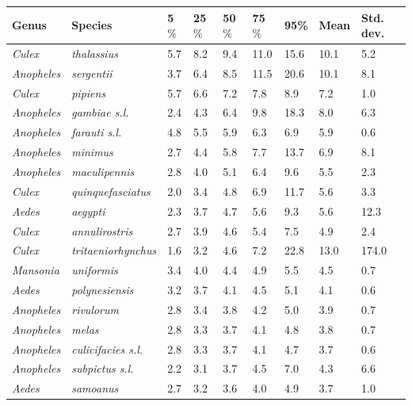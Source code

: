 \documentclass[12pt]{article}
\begin{document}
\begin{table}[htbp!]
	\begin{tabular}{l|l|l|l|l|l|l|l|l}
		\textbf{Genus} & \textbf{Species} & \textbf{5$\%$} & \textbf{25$\%$} & \textbf{50$\%$} & \textbf{75$\%$} & \textbf{95\%} &  \textbf{Mean} & \textbf{Std. dev.}\\
		\hline
		\textit{Culex} & \textit{thalassius} & 5.7 & 8.2 & 9.4 & 11.0 & 15.6 & 10.1 & 5.2 \\
		\textit{Anopheles} & \textit{sergentii} & 3.7 & 6.4 & 8.5 & 11.5 & 20.6 & 10.1 & 8.1 \\
		\textit{Culex} & \textit{pipiens} & 5.7 & 6.6 & 7.2 & 7.8 & 8.9 & 7.2 & 1.0 \\
		\textit{Anopheles} & \textit{gambiae s.l.} & 2.4 & 4.3 & 6.4 & 9.8 & 18.3 & 8.0 & 6.3 \\
		\textit{Anopheles} & \textit{farauti s.l.} & 4.8 & 5.5 & 5.9 & 6.3 & 6.9 & 5.9 & 0.6 \\
		\textit{Anopheles} & \textit{minimus} & 2.7 & 4.4 & 5.8 & 7.7 & 13.7 & 6.9 & 8.1 \\
		\textit{Anopheles} & \textit{maculipennis} & 2.8 & 4.0 & 5.1 & 6.4 & 9.6 & 5.5 & 2.3 \\
		\textit{Culex} & \textit{quinquefasciatus} & 2.0 & 3.4 & 4.8 & 6.9 & 11.7 & 5.6 & 3.3 \\
		\textit{Aedes} & \textit{aegypti} & 2.3 & 3.7 & 4.7 & 5.6 & 9.3 & 5.6 & 12.3 \\
		\textit{Culex} & \textit{annulirostris} & 2.7 & 3.9 & 4.6 & 5.4 & 7.5 & 4.9 & 2.4 \\
		\textit{Culex} & \textit{tritaeniorhynchus} & 1.6 & 3.2 & 4.6 & 7.2 & 22.8 & 13.0 & 174.0 \\
		\textit{Mansonia} & \textit{uniformis} & 3.4 & 4.0 & 4.4 & 4.9 & 5.5 & 4.5 & 0.7 \\
		\textit{Aedes} & \textit{polynesiensis} & 3.2 & 3.7 & 4.1 & 4.5 & 5.1 & 4.1 & 0.6 \\
		\textit{Anopheles} & \textit{rivulorum} & 2.8 & 3.4 & 3.8 & 4.2 & 5.0 & 3.9 & 0.7 \\
		\textit{Anopheles} & \textit{melas} & 2.8 & 3.3 & 3.7 & 4.1 & 4.8 & 3.8 & 0.7 \\
		\textit{Anopheles} & \textit{culicifacies s.l.} & 2.8 & 3.3 & 3.7 & 4.1 & 4.7 & 3.7 & 0.6 \\
		\textit{Anopheles} & \textit{subpictus s.l.} & 2.2 & 3.1 & 3.7 & 4.5 & 7.0 & 4.3 & 6.6 \\
		\textit{Aedes} & \textit{samoanus} & 2.7 & 3.2 & 3.6 & 4.0 & 4.9 & 3.7 & 1.0 \\

\end{tabular}
\end{table}
\end{document}

